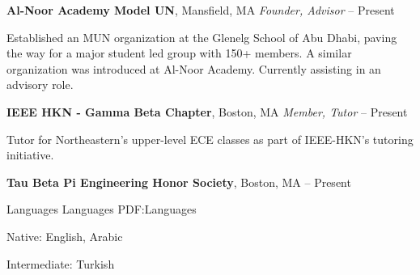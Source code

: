 \documentclass[letterpaper,MMMyyyy,nonstopmode]{simpleresumecv}
\begin{document}
\begin{Body}
\Entry
\textbf{Al-Noor Academy Model UN},
Mansfield, MA
\Gap
\textit{Founder, Advisor}
\hfill
{} --
Present
\begin{Detail}
\Item
Established an MUN organization at the Glenelg School of Abu Dhabi, paving the way for a major student led
group with 150+ members. A similar organization was introduced at Al-Noor Academy. Currently assisting in an advisory role.
\end{Detail}

\Entry
\textbf{IEEE HKN - Gamma Beta Chapter},
Boston, MA
\Gap
\textit{Member, Tutor}
\hfill
{} --
Present
\begin{Detail}
\Item
Tutor for Northeastern's upper-level ECE classes as part of IEEE-HKN's tutoring initiative.
\end{Detail}

\Entry
\textbf{Tau Beta Pi Engineering Honor Society},
Boston, MA
\hfill
{} --
Present


\Section
{Languages}
{Languages}
{PDF:Languages}

\BulletItem
Native: English, Arabic

\Gap
\BulletItem
Intermediate: Turkish












\end{Body}
\end{document}
